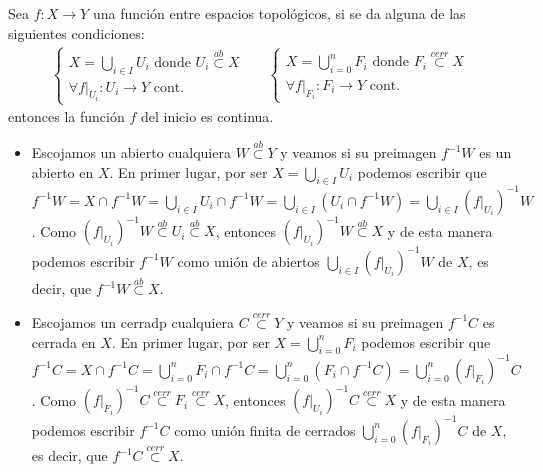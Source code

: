 \begin{prop}
Sea $f: X \rightarrow Y$ una función entre espacios topológicos, si se da alguna de las siguientes condiciones: 
\begin{align*}
\begin{cases}
X = \bigcup_{i \in  I} U_i \mbox{ donde } U_i \stackrel{ab}{\subset} X \\
\forall f|_{U_i} : U_i \rightarrow Y \mbox{ cont.}
\end{cases}
& &
\begin{cases}
X = \bigcup_{i =0}^n F_i \mbox{ donde } F_i \stackrel{cerr}{\subset} X \\
\forall f|_{F_i} : F_i \rightarrow Y \mbox{ cont.}
\end{cases}
\end{align*}
entonces la función $f$ del inicio es continua.
\end{prop}
\begin{demo}
	\begin{itemize}
	\item Escojamos un abierto cualquiera $W \stackrel{ab}{\subset} Y$ y veamos si su preimagen $f^{-1}W$ es un abierto en $X$. En primer lugar, por ser $X = \bigcup_{i \in  I} U_i$ podemos escribir que $f^{-1}W = X\cap f^{-1}W = \bigcup_{i \in  I} U_i \cap f^{-1} W = \bigcup_{i \in  I} \left( U_i \cap f^{-1} W\right) = \bigcup_{i \in  I} \left( f|_{U_i} \right)^{-1} W$. Como $\left( f|_{U_i} \right)^{-1}W \stackrel{ab}{\subset} U_i \stackrel{ab}{\subset} X$, entonces $\left( f|_{U_i} \right)^{-1} W \stackrel{ab}{\subset} X$ y de esta manera podemos escribir $f^{-1}W$ como unión de abiertos $\bigcup_{i \in  I} \left( f|_{U_i} \right)^{-1} W$ de $X$, es decir, que $f^{-1}W \stackrel{ab}{\subset} X$.
	
	\item Escojamos un cerradp cualquiera $C \stackrel{cerr}{\subset} Y$ y veamos si su preimagen $f^{-1}C$ es cerrada en $X$. En primer lugar, por ser $X = \bigcup_{i=0}^n F_i$ podemos escribir que $f^{-1}C = X\cap f^{-1}C = \bigcup_{i = 0}^n F_i \cap f^{-1} C = \bigcup_{i = 0}^n \left( F_i \cap f^{-1} C\right) = \bigcup_{i = 0}^n \left( f|_{F_i} \right)^{-1} C$. Como $\left( f|_{F_i} \right)^{-1}C \stackrel{cerr}{\subset} F_i \stackrel{cerr}{\subset} X$, entonces $\left( f|_{U_i} \right)^{-1} C \stackrel{cerr}{\subset} X$ y de esta manera podemos escribir $f^{-1}C$ como unión finita de cerrados $\bigcup_{i = 0}^n \left( f|_{F_i} \right)^{-1} C$ de $X$, es decir, que $f^{-1}C \stackrel{cerr}{\subset} X$.
    \end{itemize}
\end{demo}

